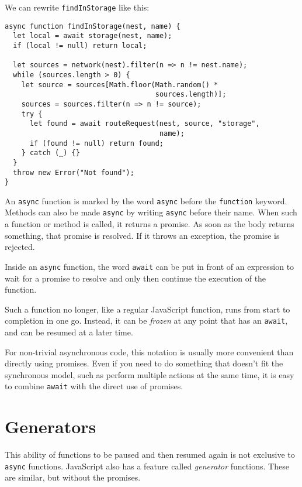 We can rewrite \lstinline`findInStorage` like this:

\begin{lstlisting}
async function findInStorage(nest, name) {
  let local = await storage(nest, name);
  if (local != null) return local;

  let sources = network(nest).filter(n => n != nest.name);
  while (sources.length > 0) {
    let source = sources[Math.floor(Math.random() *
                                    sources.length)];
    sources = sources.filter(n => n != source);
    try {
      let found = await routeRequest(nest, source, "storage",
                                     name);
      if (found != null) return found;
    } catch (_) {}
  }
  throw new Error("Not found");
}
\end{lstlisting}
\noindent{}

An \lstinline`async` function is marked by the word \lstinline`async` before the \lstinline`function` keyword. Methods can also be made \lstinline`async` by writing \lstinline`async` before their name. When such a function or method is called, it returns a promise. As soon as the body returns something, that promise is resolved. If it throws an exception, the promise is rejected.

Inside an \lstinline`async` function, the word \lstinline`await` can be put in front of an expression to wait for a promise to resolve and only then continue the execution of the function.

Such a function no longer, like a regular JavaScript function, runs from start to completion in one go. Instead, it can be \emph{frozen} at any point that has an \lstinline`await`, and can be resumed at a later time.

For non-trivial asynchronous code, this notation is usually more convenient than directly using promises. Even if you need to do something that doesn't fit the synchronous model, such as perform multiple actions at the same time, it is easy to combine \lstinline`await` with the direct use of promises.

\section{Generators}

This ability of functions to be paused and then resumed again is not exclusive to \lstinline`async` functions. JavaScript also has a feature called \emph{generator} functions. These are similar, but without the promises.


